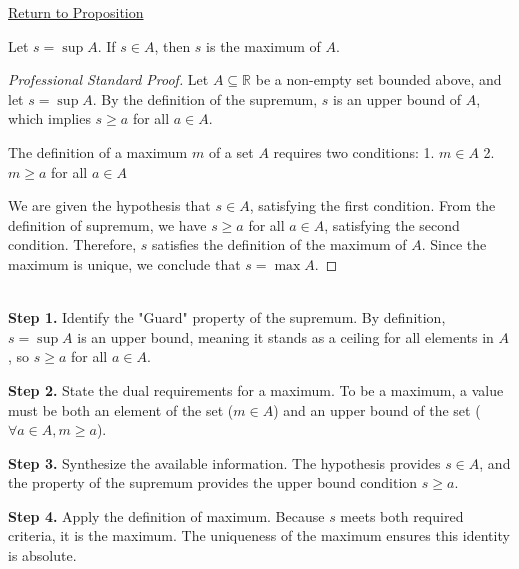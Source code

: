 \newpage
{}
\label{prf:supremum-in-the-set-is-the-maximum}

\begin{remark*}[Return]
\hyperref[prop:supremum-in-the-set-is-the-maximum]{Return to Proposition}
\end{remark*}

\begin{proposition*}
Let $s = \sup A$. If $s \in A$, then $s$ is the maximum of $A$.
\end{proposition*}

\begin{proof}[Professional Standard Proof]
\LRAProofBodyStart
Let $A \subseteq \mathbb{R}$ be a non-empty set bounded above, and let $s = \sup A$. By the definition of the supremum, $s$ is an upper bound of $A$, which implies $s \ge a$ for all $a \in A$. 

The definition of a maximum $m$ of a set $A$ requires two conditions:
1. $m \in A$
2. $m \ge a$ for all $a \in A$

We are given the hypothesis that $s \in A$, satisfying the first condition. From the definition of supremum, we have $s \ge a$ for all $a \in A$, satisfying the second condition. Therefore, $s$ satisfies the definition of the maximum of $A$. Since the maximum is unique, we conclude that $s = \max A$.
\end{proof}

\begin{remark*}~\\
\textbf{Step 1.} Identify the "Guard" property of the supremum. By definition, $s = \sup A$ is an upper bound, meaning it stands as a ceiling for all elements in $A$, so $s \ge a$ for all $a \in A$.

\textbf{Step 2.} State the dual requirements for a maximum. To be a maximum, a value must be both an element of the set ($m \in A$) and an upper bound of the set ($\forall a \in A, m \ge a$).

\textbf{Step 3.} Synthesize the available information. The hypothesis provides $s \in A$, and the property of the supremum provides the upper bound condition $s \ge a$.

\textbf{Step 4.} Apply the definition of maximum. Because $s$ meets both required criteria, it is the maximum. The uniqueness of the maximum ensures this identity is absolute.
\end{remark*}

